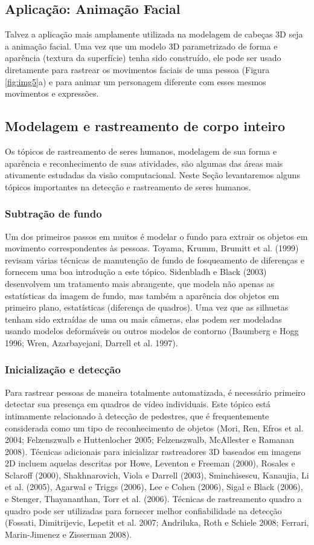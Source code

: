 \documentclass{article}
\begin{document}
\subsection{Aplicação: Animação Facial}
Talvez a aplicação mais amplamente utilizada na modelagem de cabeças 3D seja a animação facial. Uma vez que um modelo 3D parametrizado de forma e aparência (textura da superfície) tenha sido construído, ele pode ser usado diretamente para rastrear os movimentos faciais de uma pessoa (Figura \ref{fig:img5}a) e para animar um personagem diferente com esses mesmos movimentos e expressões.

\subsection{Modelagem e rastreamento de corpo inteiro}
Os tópicos de rastreamento de seres humanos, modelagem de sua forma e aparência e reconhecimento de suas atividades, são algumas das áreas mais ativamente estudadas da visão computacional. Neste Seção levantaremos alguns tópicos importantes na detecção e rastreamento de seres humanos.

\subsubsection{Subtração de fundo}
Um dos primeiros passos em muitos é modelar o fundo para extrair os objetos em movimento correspondentes às pessoas. Toyama, Krumm, Brumitt et al. (1999) revisam várias técnicas de manutenção de fundo de fosqueamento de diferenças e fornecem uma boa introdução a este tópico. Sidenbladh e Black (2003) desenvolvem um tratamento mais abrangente, que modela não apenas as estatísticas da imagem de fundo, mas também a aparência dos objetos em primeiro plano, estatísticas (diferença de quadros). Uma vez que as silhuetas tenham sido extraídas de uma ou mais câmeras, elas podem ser modeladas usando modelos deformáveis ou outros modelos de contorno (Baumberg e Hogg 1996; Wren, Azarbayejani, Darrell et al. 1997).

\subsubsection{Inicialização e detecção}
Para rastrear pessoas de maneira totalmente automatizada, é necessário primeiro detectar sua presença em quadros de vídeo individuais. Este tópico está intimamente relacionado à detecção de pedestres, que é frequentemente considerada como um tipo de reconhecimento de objetos (Mori, Ren, Efros et al. 2004; Felzenszwalb e Huttenlocher 2005; Felzenszwalb, McAllester e Ramanan 2008). Técnicas adicionais para inicializar rastreadores 3D baseados em imagens 2D incluem aquelas descritas por Howe, Leventon e Freeman (2000), Rosales e Sclaroff (2000), Shakhnarovich, Viola e Darrell (2003), Sminchisescu, Kanaujia, Li et al. (2005), Agarwal e Triggs (2006), Lee e Cohen (2006), Sigal e Black (2006), e Stenger, Thayananthan, Torr et al. (2006). Técnicas de rastreamento quadro a quadro pode ser utilizadas para fornecer melhor confiabilidade na detecção (Fossati, Dimitrijevic, Lepetit et al. 2007; Andriluka, Roth e Schiele 2008; Ferrari, Marin-Jimenez e Zisserman 2008).
\end{document}
